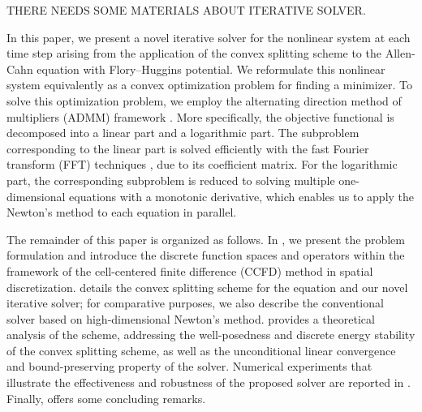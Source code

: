 \par THERE NEEDS SOME MATERIALS ABOUT ITERATIVE SOLVER.
\par In this paper, we present a novel iterative solver for the nonlinear system at each time step arising from the application of the convex splitting scheme to the Allen-Cahn equation with Flory–Huggins potential. 
We reformulate this nonlinear system equivalently as a convex optimization problem for finding a minimizer. 
To solve this optimization problem, we employ the alternating direction method of multipliers (ADMM) framework \cite{neal2011distributed}. 
More specifically, the objective functional is decomposed into a linear part and a logarithmic part. 
The subproblem corresponding to the linear part is solved efficiently with the fast Fourier transform (FFT) techniques \cite{cooley1965algorithm}, due to its coefficient matrix. 
For the logarithmic part, the corresponding subproblem is reduced to solving multiple one-dimensional equations with a monotonic derivative, 
which enables us to apply the Newton's method to each equation \cite{dennis1996numerical,ortega2000iterative} in parallel.
\par The remainder of this paper is organized as follows. 
In , we present the problem formulation and introduce the discrete function spaces and operators within the framework of the cell-centered finite difference (CCFD) method in spatial discretization. 
 details the convex splitting scheme for the equation and our novel iterative solver; 
for comparative purposes, we also describe the conventional solver based on high-dimensional Newton's method. 
 provides a theoretical analysis of the scheme, addressing the well-posedness and discrete energy stability of the convex splitting scheme, 
as well as the unconditional linear convergence and bound-preserving property of the solver. 
Numerical experiments that illustrate the effectiveness and robustness of the proposed solver are reported in . 
Finally,  offers some concluding remarks.

